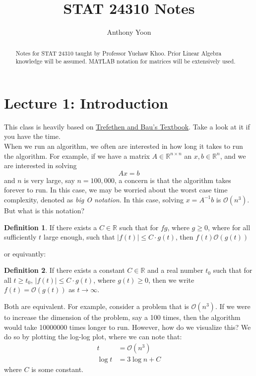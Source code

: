 \documentclass[11pt]{article}
\title{STAT 24310 Notes}
\author{Anthony Yoon}
\theoremstyle{definition}
\newtheorem{definition}{Definition}[section]
\newcommand{\R}{\mathbb{R}}
\begin{document}
\maketitle
\tableofcontents
\begin{abstract}
  Notes for STAT 24310 taught by Professor Yuehaw Khoo. Prior Linear Algebra knowledge will be assumed.  MATLAB notation for matrices will be extensively used. 
\end{abstract}
\newpage
\section{Lecture 1: Introduction}
This class is heavily based on \href{https://www.stat.uchicago.edu/~lekheng/courses/309/books/Trefethen-Bau.pdf}{Trefethen and Bau's Textbook}. Take a look at it if you have the time. \\
When we run an algorithm, we often are interested in how long it takes to run the algorithm. For example, if we have a matrix $A \in \R^{n \times n}$ an $x, b \in \R^n$, and we are interested in solving 
\[
Ax = b
\]
and $n$ is very large, say $ n = 100,000$, a concern is that the algorithm takes forever to run. In this case, we may be worried about the worst case time complexity, denoted as \emph{big O notation}. In this case, solving $x = A^{-1} b$ is $\mathcal{O}(n^3)$. But what is this notation? 
\begin{definition}
  If there exists a $C \in \R$ such that for $f g$, where $g \geq 0$, where for all sufficiently $t$ large enough, such that $|f(t)| \leq C \cdot g(t)$, then $f(t) \mathcal{O}(g(t))$ 
\end{definition}
or equivantly:
\begin{definition}
  If there exists a constant \( C \in \mathbb{R} \) and a real number \( t_0 \) such that for all \( t \geq t_0 \), \( |f(t)| \leq C \cdot g(t) \), where \( g(t) \geq 0 \), then we write \( f(t) = \mathcal{O}(g(t)) \) as \( t \to \infty \).
\end{definition}
Both are equivalent. For example, consider a problem that is $\mathcal{O}(n^3)$. If we were to increase the dimension of the problem, say a 100 times, then the algorithm would take 10000000 times longer to run. However, how do we visualize this? We do so by plotting the log-log plot, where we can note that:
\begin{align*}
  t &= \mathcal{O}(n^3)\\
  \log t &= 3 \log n + C
\end{align*}
where $C$ is some constant. 
\end{document}
